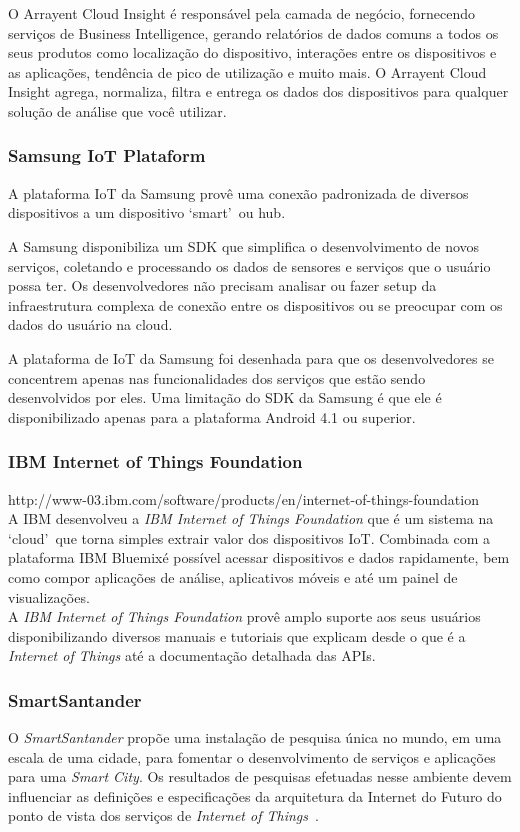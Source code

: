O Arrayent Cloud Insight é responsável pela camada de negócio, fornecendo serviços de Business Intelligence,
gerando relatórios de dados comuns a todos os seus produtos como localização do dispositivo, interações entre
os dispositivos e as aplicações, tendência de pico de utilização e muito mais. O Arrayent Cloud Insight agrega,
normaliza, filtra e entrega os dados dos dispositivos para qualquer solução de análise que você utilizar.

\subsubsection{Samsung IoT Plataform}
A plataforma IoT da Samsung provê uma conexão padronizada de diversos dispositivos a um dispositivo
\lq smart\rq\ ou hub.

A Samsung disponibiliza um SDK que simplifica o desenvolvimento de novos serviços, coletando
e processando os dados de sensores e serviços que o usuário possa ter. Os desenvolvedores não precisam analisar ou
fazer setup da infraestrutura complexa de conexão entre os dispositivos ou se preocupar com os dados do usuário na cloud.

A plataforma de IoT da Samsung foi desenhada para que os desenvolvedores se concentrem apenas nas funcionalidades
dos serviços que estão sendo desenvolvidos por eles. Uma limitação do SDK da Samsung é que ele é disponibilizado
apenas para a plataforma Android 4.1 ou superior.

\subsubsection{IBM Internet of Things Foundation}
http://www-03.ibm.com/software/products/en/internet-of-things-foundation\\
A IBM desenvolveu a \textit{IBM Internet of Things Foundation} que é um sistema na \lq cloud\rq\ que torna simples
extrair valor dos dispositivos IoT. Combinada com a plataforma IBM Bluemix\texttrademark é possível acessar
dispositivos e dados rapidamente, bem como compor aplicações de análise, aplicativos móveis e até um painel
de visualizações.\\

A \textit{IBM Internet of Things Foundation} provê amplo suporte aos seus usuários
disponibilizando diversos manuais e tutoriais que explicam desde o que é a \textit{Internet of Things}
até a documentação detalhada das APIs.

\subsubsection{SmartSantander}
O \textit{SmartSantander} propõe uma instalação de pesquisa única no mundo, em uma escala de uma cidade,
para fomentar o desenvolvimento de serviços e aplicações para uma \textit{Smart City}.
Os resultados de pesquisas efetuadas nesse ambiente devem influenciar as definições e especificações da arquitetura da
Internet do Futuro do ponto de vista dos serviços de \textit{Internet of Things}~\cite{citeulike:13508566}.

